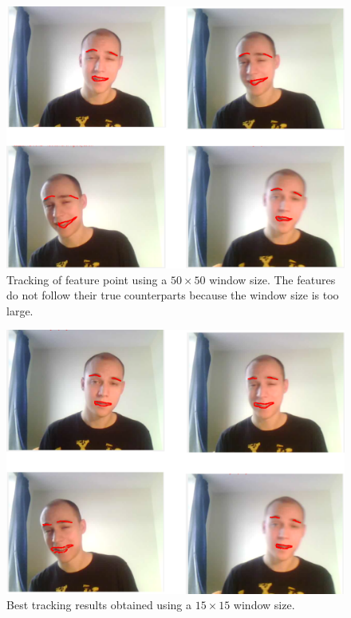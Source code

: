 \documentclass[11pt,a4paper,twoside]{report}
\begin{document}
\begin{figure}[H]
\begin{centering}
\includegraphics[scale=0.31]{images/50x50opt.png}
\par\end{centering}

\caption{Tracking of feature point using a $50 \times 50$ window size. The
  features do not follow their true counterparts because the window size is too large.}
\label{fg:50opt}
\end{figure}

\begin{figure}[H]
\begin{centering}
\includegraphics[scale=0.31]{images/8x8opt.png}
\par\end{centering}

\caption{Best tracking results obtained using a $15 \times 15$ window size.}
\label{fg:8opt}
\end{figure}
\end{document}
